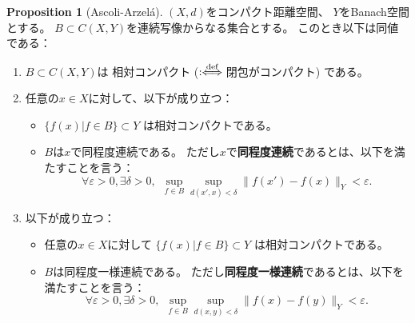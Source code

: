 \documentclass[uplatex]{jsarticle}
\theoremstyle{definition}
\newtheorem{prop}[prop]{Proposition}
\newcommand{\ep}{\varepsilon}
\newcommand{\deff}{:\hspace{-3pt}\overset{\text{def}}{\iff}}
\begin{document}
\begin{prop}[Ascoli-Arzel\'{a}]
  \label{Ascoli}
  \((X,d)\)をコンパクト距離空間、
  \(Y\)をBanach空間とする。
  \(B\subset C(X,Y)\)を連続写像からなる集合とする。
  このとき以下は同値である：
  \begin{enumerate}
    \item \label{enumi: rel cpt prop: Ascoli}
    \(B\subset C(X,Y)\)は
    相対コンパクト (\(\deff\)閉包がコンパクト) である。
    \item \label{enumi: equi conti prop: Ascoli}
    任意の\(x\in X\)に対して、以下が成り立つ：
    \begin{itemize}
      \item
      \(\{f(x) | f\in B\} \subset Y\)
      は相対コンパクトである。
      \item
      \(B\)は\(x\)で同程度連続である。
      ただし\(x\)で\textbf{同程度連続}であるとは、以下を満たすことを言う：
      \[
      \forall \ep>0, \exists \delta > 0, \ \
      \sup_{f\in B}\sup_{d(x',x)<\delta}\|f(x')-f(x)\|_Y < \ep.
      \]
    \end{itemize}
    \item \label{enumi: equi unif prop: Ascoli}
    以下が成り立つ：
    \begin{itemize}
      \item
      任意の\(x\in X\)に対して
      \(\{f(x) | f\in B\}\subset Y\)
      は相対コンパクトである。
      \item
      \(B\)は同程度一様連続である。
      ただし\textbf{同程度一様連続}であるとは、以下を満たすことを言う：
      \[
      \forall \ep>0, \exists \delta > 0, \ \
      \sup_{f\in B}\sup_{d(x,y)<\delta}\|f(x)-f(y)\|_Y < \ep.
      \]
    \end{itemize}
  \end{enumerate}
\end{prop}
\end{document}
